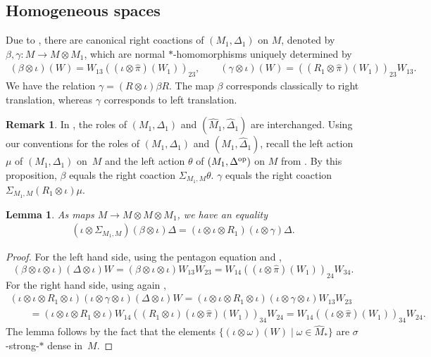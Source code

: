 \documentclass[pdftex]{sigma}
\numberwithin{equation}{section}
\newtheorem{lem}[thm]{Lemma}
\theoremstyle{definition}
\newtheorem{rmk}[thm]{Remark}
\begin{document}
\subsection*{Homogeneous spaces}
Due to \cite[Proposition 3.1]{VaeVaiExt}, there are canonical right coactions of $(M_1, \Delta_1)$ on $M$, denoted by $\beta, \gamma: M \rightarrow M \otimes M_1$, which are normal $\ast$-homomorphisms uniquely determined by
\begin{gather}\label{EqnBeta}
 (\beta \otimes \iota)(W)  = W_{13} \left((\iota \otimes \hat{\pi})(W_1)\right)_{23}, \qquad
 (\gamma \otimes \iota)(W) =  \left((R_1 \otimes \hat{\pi})(W_1)\right)_{23} W_{13}.
\end{gather}
We have the relation $\gamma = (R \otimes \iota)  \beta  R$. The map $\beta$ corresponds classically to right translation, whereas $\gamma$ corresponds to left translation.

\begin{rmk}
 In \cite[Section 3]{VaeVaiExt}, the roles of $(M_1, \Delta_1)$ and $(\hat{M}_1, \hat{\Delta}_1)$ are interchanged. Using our conventions for the roles of $(M_1, \Delta_1)$ and $(\hat{M}_1, \hat{\Delta}_1)$, recall the left action $\mu$ of $(M_1, \Delta_1)$ on~$M$ and the left action $\theta$ of $(M_1, \Delta^{\rm op})$ on $M$ from \cite[Proposition~3.1]{VaeVaiExt}. By this proposition, $\beta$ equals the right coaction $\Sigma_{M_1, M}   \theta$. $\gamma$ equals the right coaction $\Sigma_{M_1, M} (R_1 \otimes \iota) \mu$.
\end{rmk}


\begin{lem}\label{LemInterchangeLR}
As maps $M \rightarrow M \otimes M \otimes M_1$, we have an equality
\begin{gather}
 (\iota \otimes \Sigma_{M_1, M}) (\beta \otimes \iota)  \Delta  = (\iota \otimes \iota \otimes R_1)(\iota \otimes \gamma) \Delta.\label{EqnGammaBetaRelI}
\end{gather}
\end{lem}
\begin{proof}
For the left hand side, using the pentagon equation and \cite[Proposition 3.1]{VaeVaiExt},
 \[
  (\beta \otimes \iota \otimes \iota)  (\Delta\otimes \iota) W = (\beta \otimes \iota \otimes \iota)  W_{13} W_{23} =
W_{14} ((\iota \otimes \hat{\pi})(W_1))_{24} W_{34}.
 \]
For the right hand side, using again \cite[Proposition 3.1]{VaeVaiExt},
\begin{gather*}
 (\iota \otimes \iota \otimes R_1 \otimes \iota)(\iota \otimes \gamma \otimes \iota) (\Delta \otimes \iota) W =
 (\iota \otimes \iota \otimes R_1 \otimes \iota)(\iota \otimes \gamma \otimes \iota) W_{13} W_{23} \\
\qquad {}=   (\iota \otimes \iota \otimes R_1 \otimes \iota) W_{14} ((R_1 \otimes \iota)(\iota \otimes \hat{\pi})(W_1))_{34} W_{24} =
W_{14} ((\iota \otimes \hat{\pi})(W_1))_{34} W_{24}.
\end{gather*}
The lemma follows by the fact that the elements $\{ (\iota \otimes \omega)(W) \mid \omega \in \hat{M}_\ast\}$ are $\sigma$-strong-$\ast$ dense in~$M$.
\end{proof}
\end{document}
